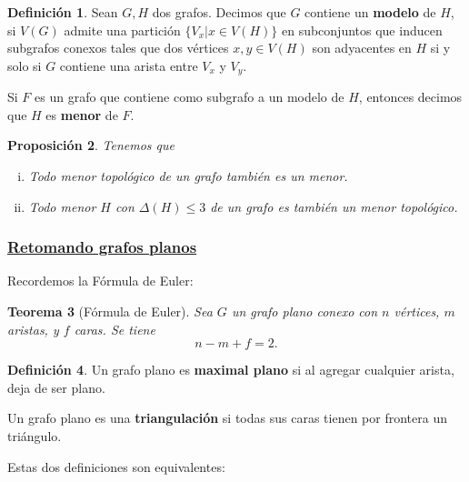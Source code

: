 \documentclass[12pt]{report}
\theoremstyle{plain}
\newtheorem{theorem}{Teorema}[section]
\newtheorem{proposition}[theorem]{Proposición}
\theoremstyle{definition}
\newtheorem{definition}[theorem]{Definición}
\begin{document}
\begin{definition}
Sean $G,H$ dos grafos. Decimos que $G$ contiene un \textbf{modelo} de $H$, si $V(G)$ admite una partición $\{V_x | x \in V(H)\}$ en subconjuntos que inducen subgrafos conexos tales que dos vértices $x,y \in V(H)$ son adyacentes en $H$ si y solo si $G$ contiene una arista entre $V_x$ y $V_y$.
\end{definition}


Si $F$ es un grafo que contiene como subgrafo a un modelo de $H$, entonces decimos que $H$ es \textbf{menor} de $F$.

\begin{proposition}\label{proposition:relaciones entre menor y menor topologico}
Tenemos que
\begin{enumerate}[(i)]
\item Todo menor topológico de un grafo también es un menor.
\item Todo menor $H$ con $\Delta (H) \leq 3$ de un grafo es también un menor topológico.
\end{enumerate}
\end{proposition}

\subsubsection{\underline{Retomando grafos planos}}

Recordemos la Fórmula de Euler:
\begin{theorem}[Fórmula de Euler]
Sea $G$ un grafo plano conexo con $n$ vértices, $m$ aristas, y $f$ caras. Se tiene
\[
    n-m + f = 2.
\]
\end{theorem}

\begin{definition}
Un grafo plano es \textbf{maximal plano} si al agregar cualquier arista, deja de ser plano.

Un grafo plano es una \textbf{triangulación} si todas sus caras tienen por frontera un triángulo.
\end{definition}

Estas dos definiciones son equivalentes:
\end{document}
